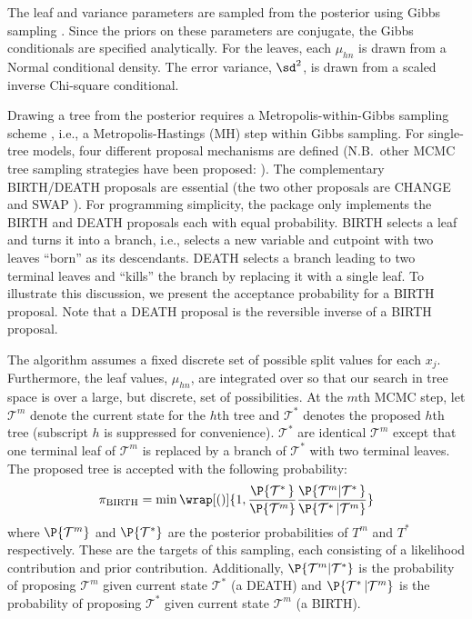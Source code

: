 \documentclass[article]{jss}
\begin{document}
The leaf and variance parameters are sampled from the posterior using
Gibbs sampling \citep{GemaGema84,GelfSmit90}.  Since the priors on these
parameters are conjugate, the Gibbs conditionals are specified
analytically. For the leaves, each $\mu_{hn}$ is drawn from a Normal
conditional density. The error variance, $\sd^2$, is drawn from a
scaled inverse Chi-square conditional.

Drawing a tree from the posterior requires a Metropolis-within-Gibbs
sampling scheme \citep{Muel91,Muel93}, i.e., a Metropolis-Hastings
(MH) step \citep{MetrRose53,Hast70} within Gibbs sampling.  For
single-tree models, four different proposal mechanisms are defined
\citep{ChipGeor98} (N.B.\ other MCMC tree sampling strategies have been
proposed: \citet{DeniMall98,WuTjel07,Prat16}).  The complementary
BIRTH/DEATH proposals are essential (the two other proposals
 are CHANGE and SWAP \citep{ChipGeor98}).
 For programming simplicity, the  package only implements
 the BIRTH and DEATH proposals each with equal probability.  BIRTH
 selects a leaf and turns it into a branch, i.e., selects a new
 variable and cutpoint with two leaves ``born'' as its
 descendants. DEATH selects a branch leading to two terminal leaves
 and ``kills'' the branch by replacing it with a single
 leaf. %
 To illustrate this discussion, we present the acceptance probability
 for a BIRTH proposal. Note that a DEATH proposal is the reversible
 inverse of a BIRTH proposal.

The algorithm assumes a fixed discrete set of possible split values
for each $x_j$. %
Furthermore, the leaf values, $\mu_{hn}$, are integrated over so
that our search in tree space is over a large, but discrete, set of
possibilities.  At the $m$th MCMC step, let $\mathcal{T}^m$ denote the
current state for the $h$th tree and $\mathcal{T}^*$ denotes the
proposed $h$th tree (subscript $h$ is suppressed for convenience).
$\mathcal{T}^*$ are identical $\mathcal{T}^m$ except that one terminal
leaf of $\mathcal{T}^m$ is replaced by a branch of $\mathcal{T}^*$
with two terminal leaves.  The proposed tree is accepted with the
following probability:
\begin{align*}
\pi_{\mathrm{BIRTH}}=\min\wrap[()]{1, 
\frac{\P{\mathcal{T}^*\,}}{\P{\mathcal{T}^m}}
\frac{\P{\mathcal{T}^m|\mathcal{T}^*\,}}
{\P{\mathcal{T}^*\,|\mathcal{T}^m}}}
\end{align*} where $\P{\mathcal{T}^m}$ and $\P{\mathcal{T}^*}$
are the posterior probabilities of ${T}^m$ and ${T}^*$
respectively. These are the targets of this sampling,
each consisting of a likelihood contribution and prior
contribution. Additionally, $\P{\mathcal{T}^m|\mathcal{T}^*}$
is the probability of proposing $\mathcal{T}^m$ given current
state $\mathcal{T}^*$ (a DEATH) and
$\P{\mathcal{T}^*\,|\mathcal{T}^m}$
is the probability of proposing $\mathcal{T}^*$ given current
state $\mathcal{T}^m$ (a BIRTH).
\end{document}
